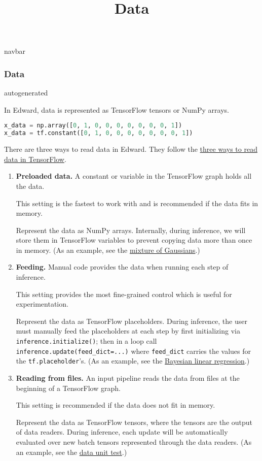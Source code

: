 \title{Data}

{{navbar}}

\subsubsection{Data}

{{autogenerated}}

In Edward, data is represented as TensorFlow tensors or NumPy arrays.

\begin{lstlisting}[language=Python]
x_data = np.array([0, 1, 0, 0, 0, 0, 0, 0, 0, 1])
x_data = tf.constant([0, 1, 0, 0, 0, 0, 0, 0, 0, 1])
\end{lstlisting}

There are three ways to read data in Edward. They follow the
\href{https://www.tensorflow.org/versions/master/how_tos/reading_data/index.html}
{three ways to read data in TensorFlow}.

\begin{enumerate}
\item
   \textbf{Preloaded data.} A constant or variable in the TensorFlow graph
   holds all the data.

   This setting is the fastest to work with and is recommended if the
   data fits in memory.

   Represent the data as NumPy arrays.
   Internally, during inference, we will store them in TensorFlow variables to prevent
   copying data more than once in memory.
   (As an example, see
   the
   \href{https://github.com/blei-lab/edward/blob/master/examples/tf_mixture_gaussian.py}
   {mixture of Gaussians}.)
\item
   \textbf{Feeding.} Manual code provides the data when running each step of
   inference.

   This setting provides the most fine-grained control which is useful for experimentation.

   Represent the data as TensorFlow placeholders. During inference,
   the user must manually feed the placeholders at each
   step by first initializing via \texttt{inference.initialize()}; then
   in a loop call \texttt{inference.update(feed_dict={...})} where
   \texttt{feed_dict} carries the values for the \texttt{tf.placeholder}'s.
   (As an example, see
   the
   \href{https://github.com/blei-lab/edward/blob/master/examples/bayesian_linear_regression.py}
   {Bayesian linear regression}.)
\item
   \textbf{Reading from files.} An input pipeline reads the data from files
   at the beginning of a TensorFlow graph.

   This setting is recommended if the data does not fit in memory.

   Represent the data as TensorFlow tensors, where the tensors are the
   output of data readers. During inference, each update will be
   automatically evaluated over new batch tensors represented through
   the data readers. (As an example, see
   the
   \href{https://github.com/blei-lab/edward/blob/master/tests/test_inference_data.py}
   {data unit test}.)
\end{enumerate}

